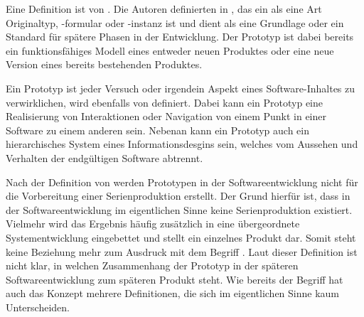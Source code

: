 Eine Definition ist von \citeauthor{Arnowitz.2007}. Die Autoren definierten in  \cite{Arnowitz.2007}, das ein  als eine Art Originaltyp, -formular oder -instanz ist und dient als eine Grundlage oder ein Standard für spätere Phasen in der Entwicklung. Der Prototyp ist dabei bereits ein funktionsfähiges Modell eines entweder neuen Produktes oder eine neue Version eines bereits bestehenden Produktes. 


Ein Prototyp ist jeder Versuch oder irgendein Aspekt eines Software-Inhaltes zu verwirklichen, wird ebenfalls von \citeauthor{Arnowitz.2007} definiert. Dabei kann ein Prototyp eine Realisierung von Interaktionen oder Navigation von einem Punkt in einer Software zu einem anderen sein. Nebenan kann ein Prototyp auch ein hierarchisches System eines Informationsdesgins sein, welches vom Aussehen und Verhalten der endgültigen Software abtrennt.


Nach der Definition von \citeauthor{Bleek.2002} werden Prototypen in der Softwareentwicklung nicht für die Vorbereitung einer Serienproduktion erstellt. Der Grund hierfür ist, dass in der Softwareentwicklung im eigentlichen Sinne keine Serienproduktion existiert. Vielmehr wird das Ergebnis häufig zusätzlich in eine übergeordnete Systementwicklung eingebettet und stellt ein einzelnes Produkt dar. Somit steht keine Beziehung mehr zum Ausdruck  mit dem Begriff . 
Laut dieser Definition ist nicht klar, in welchen Zusammenhang der Prototyp in der späteren Softwareentwicklung zum späteren Produkt steht. 
Wie bereits der Begriff  hat auch das Konzept  mehrere Definitionen, die sich im eigentlichen Sinne kaum Unterscheiden.


